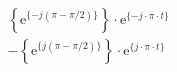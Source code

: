 \[
\begin{split}
& \left \{ \textrm{e}^{\{-j (\pi-\pi/2) \}} \right \} \cdot \textrm{e}^{\{- j \cdot \pi \cdot t \}}\\
&-\left \{ \textrm{e}^{\{ j (\pi-\pi/2) \}} \right \} \cdot \textrm{e}^{\{  j \cdot \pi \cdot t \}}
\end{split}
\]
